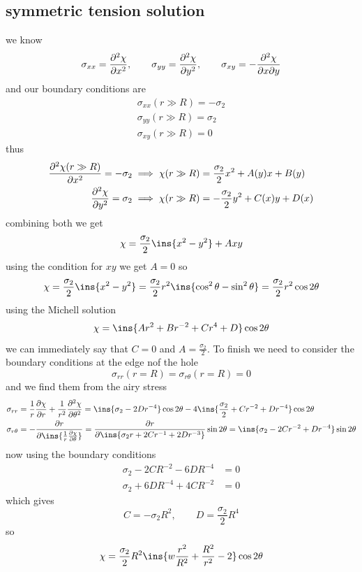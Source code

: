 \subsection{symmetric tension solution}
we know
\begin{equation}
    \sigma_{xx}=\pdv[2]{\chi}{x},\qquad \sigma_{yy}=\pdv[2]{\chi}{y},\qquad\sigma_{xy}=-\pdv{\chi}{x}{y}
\end{equation}
and our boundary conditions are 
\begin{align}
    \sigma_{xx}(r\gg R)=-\sigma_2\\
    \sigma_{yy}(r\gg R)=\sigma_2\\
    \sigma_{xy}(r\gg R)=0
\end{align}
thus
\begin{align}
    \pdv[2]{\chi(r\gg R)}{x}=-\sigma_2 &\implies \chi(r\gg R) = \frac{\sigma_2}{2}x^2+A(y)x+B(y)\\
    \pdv[2]{\chi}{y}=\sigma_2 &\implies \chi(r\gg R)=-\frac{\sigma_2}{2}y^2+C(x)y+D(x)
\end{align}
combining both we get 
\begin{equation}
    \chi = \frac{\sigma_2}{2}\ins{x^2-y^2}+Axy
\end{equation}
using the condition for \(xy\) we get \(A=0\) so 
\begin{equation}
    \chi = \frac{\sigma_2}{2}\ins{x^2-y^2} = \frac{\sigma_2}{2}r^2\ins{\cos^2\theta-\sin^2\theta}= \frac{\sigma_2}{2}r^2\cos2\theta
\end{equation}
using the Michell solution
\begin{equation}
    \chi = \ins{Ar^2+Br^{-2}+Cr^4+D}\cos2\theta
\end{equation}
we can immediately say that \(C=0\) and \(A=\frac{\sigma_2}{2}\). To finish we need to consider the boundary conditions at the edge nof the hole
\begin{equation}
    \sigma_{rr}(r=R)=\sigma_{r\theta}(r=R)=0
\end{equation}
and we find them from the airy stress 
\begin{align}
    \sigma_{rr}&=\frac{1}{r}\pdv{\chi}{r}+\frac{1}{r^2}\pdv[2]{\chi}{\theta}=\ins{\sigma_2-2Dr^{-4}}\cos2\theta-4\ins{\frac{\sigma_2}{2}+Cr^{-2}+Dr^{-4}}\cos2\theta\\
    \sigma_{r\theta}&=-\pdv{r}\ins{\frac{1}{r}\pdv{\chi}{\theta}}=\pdv{r}\ins{\sigma_2 r+2Cr^{-1}+2Dr^{-3}}\sin2\theta=\ins{\sigma_2-2Cr^{-2}+Dr^{-4}}\sin2\theta
\end{align}
now using the boundary conditions 
\begin{align}
    \sigma_2-2CR^{-2}-6DR^{-4}&=0\\
    \sigma_2+6DR^{-4}+4CR^{-2}&=0
\end{align}
which gives 
\begin{equation}
    C = -\sigma_2 R^2, \qquad D=\frac{\sigma_2}{2}R^4
\end{equation}
so 
\begin{equation}
    \chi = \frac{\sigma_2}{2}R^2\ins{w\frac{r^2}{R^2}+\frac{R^2}{r^2}-2}\cos2\theta
\end{equation}
